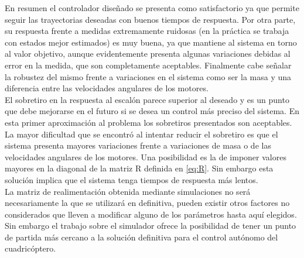 \documentclass[main]{subfiles}
\begin{document}
En resumen el controlador diseñado se presenta como satisfactorio ya que permite seguir las trayectorias deseadas con buenos tiempos de respuesta. Por otra parte, su respuesta frente a medidas extremamente ruidosas (en la pr\'actica se trabaja con estados mejor estimados) es muy buena, ya que mantiene al sistema en torno al valor objetivo, aunque evidentemente presenta algunas variaciones debidas al error en la medida, que son completamente aceptables. Finalmente cabe señalar la robustez del mismo frente a variaciones en el sistema como ser la masa y una diferencia entre las velocidades angulares de los motores.\\

El sobretiro en la respuesta al escal\'on parece superior al deseado y es un punto que debe mejorarse en el futuro si se desea un control m\'as preciso del sistema. En esta primer aproximaci\'on al problema los sobretiros presentados son aceptables. La mayor dificultad que se encontr\'o al intentar reducir el sobretiro es que el sistema presenta mayores variaciones frente a variaciones de masa o de las velocidades angulares de los motores. Una posibilidad es la de imponer valores mayores en la diagonal de la matriz R definida en \ref{eq:R}. Sin embargo esta soluci\'on implica que el sistema tenga tiempos de respuesta m\'as lentos.\\

La matriz de realimentaci\'on obtenida mediante simulaciones no ser\'a necesariamente la que se utilizar\'a en definitiva, pueden existir otros factores no considerados que lleven a modificar alguno de los par\'ametros hasta aqu\'i elegidos. Sin embargo el trabajo sobre el simulador ofrece la posibilidad de tener un punto de partida m\'as cercano a la soluci\'on definitiva para el control aut\'onomo del cuadric\'optero.\\
 
\end{document}
